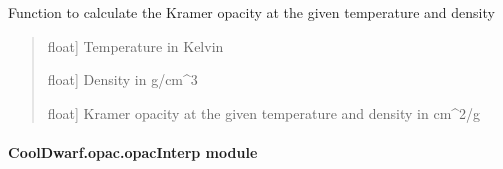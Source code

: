\documentclass[letterpaper,10pt,english]{sphinxmanual}
\begin{document}
\begin{fulllineitems}
\begin{fulllineitems}
\label{\detokenize{CoolDwarf.opac:CoolDwarf.opac.kramer.KramerOpac.kappa}}
\pysigstartsignatures
{}
\pysigstopsignatures
\sphinxAtStartPar
Function to calculate the Kramer opacity at the given temperature and density
\begin{quote}\begin{description}
\begin{description}
\sphinxlineitem{\sphinxstylestrong{temp}}{[}float{]}
\sphinxAtStartPar
Temperature in Kelvin

\sphinxlineitem{\sphinxstylestrong{density}}{[}float{]}
\sphinxAtStartPar
Density in g/cm\textasciicircum{}3

\end{description}

\begin{description}
\sphinxlineitem{\sphinxstylestrong{kappa}}{[}float{]}
\sphinxAtStartPar
Kramer opacity at the given temperature and density in cm\textasciicircum{}2/g

\end{description}

\end{description}\end{quote}

\end{fulllineitems}


\end{fulllineitems}



\paragraph{CoolDwarf.opac.opacInterp module}
\label{\detokenize{CoolDwarf.opac:module-CoolDwarf.opac.opacInterp}}\label{\detokenize{CoolDwarf.opac:cooldwarf-opac-opacinterp-module}}
\end{document}
